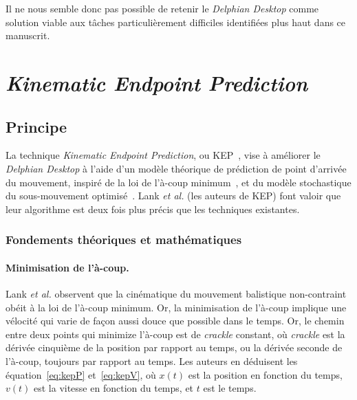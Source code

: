 	Il ne nous semble donc pas possible de retenir le \emph{Delphian Desktop} comme solution viable aux tâches particulièrement difficiles identifiées plus haut dans ce manuscrit.
	
\section{\emph{Kinematic Endpoint Prediction}}
	\subsection{Principe}
	La technique \emph{Kinematic Endpoint Prediction}, ou KEP~\cite{lank2007endpoint}, vise à améliorer le \emph{Delphian Desktop} à l'aide d'un modèle théorique de prédiction de point d'arrivée du mouvement, inspiré de la loi de l'à-coup minimum~\cite{hogan1984organizing, richardson2002comparing}\footnotemark{}, et du modèle stochastique du sous-mouvement optimisé~\cite{meyer1990speed}. Lank \emph{et al.} (les auteurs de KEP) font valoir que leur algorithme est deux fois plus précis que les techniques existantes.
	
	
	\subsubsection{Fondements théoriques et mathématiques}
	\paragraph{Minimisation de l'à-coup.}
	Lank \emph{et al.} observent que la cinématique du mouvement balistique non-contraint obéit à la loi de l'à-coup minimum. Or, la minimisation de l'à-coup implique une vélocité qui varie de façon aussi \og douce \fg{} que possible dans le temps. Or, le chemin entre deux points qui minimize l'à-coup est de \emph{crackle} constant, où \emph{crackle} est la dérivée cinquième de la position par rapport au temps, ou la dérivée seconde de l'à-coup, toujours par rapport au temps. Les auteurs en déduisent les équation~\ref{eq:kepP} et~\ref{eq:kepV}, où $x(t)$ est la position en fonction du temps, $v(t)$ est la vitesse en fonction du temps, et $t$ est le temps.
	
